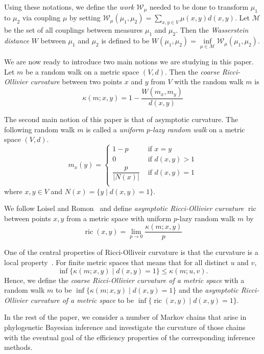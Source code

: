 \documentclass{amsart}
\newcommand{\ric}{\operatorname{ric}}
\newcommand{\W}{\mathcal{W}}
\newcommand{\M}{\mathcal{M}}
\begin{document}
Using these notations, we define the {\em work} $\W_\mu$ needed to be done to transform $\mu_1$ to $\mu_2$ via coupling $\mu$ by setting $\W_\mu(\mu_1,\mu_2) = \sum\limits_{x,y\in V}\mu(x,y) d(x,y)$.
Let $\M$ be the set of all couplings between measures $\mu_1$ and $\mu_2$.
Then the {\em Wasserstein distance} $W$ between $\mu_1$ and $\mu_2$ is defined to be $W(\mu_1,\mu_2) = \inf\limits_{\mu\in\M}\W_\mu(\mu_1,\mu_2)$.

We are now ready to introduce two main notions we are studying in this paper.
Let $m$ be a random walk on a metric space $(V,d)$.
Then the {\em coarse Ricci-Ollivier curvature} between two points $x$ and $y$ from $V$ with the random walk $m$ is
\[
\kappa(m;x,y) = 1 - \frac{W(m_x,m_y)}{d(x,y)}
\]

The second main notion of this paper is that of asymptotic curvature.
The following random walk $m$ is called a {\em uniform $p$-lazy random walk} on a metric space $(V,d)$.
\[
m_x(y) =
\begin{cases}
1-p				& \mbox{ if } x=y \\
0   				& \mbox{ if } d(x,y) > 1 \\
\dfrac{p}{|N(x)|}  & \mbox{ if } d(x,y) = 1 \\
\end{cases}
\]
where $x,y \in V$ and $N(x) = \{y \mid d(x,y) = 1\}$.

We follow Loisel and Romon~\cite{Loisel2014-gu} and define {\em asymptotic Ricci-Ollivier curvature} $\ric$ between points $x,y$ from a metric space with uniform $p$-lazy random walk $m$ by 
\[
\ric(x,y) = \lim_{p\to0} \frac{\kappa(m;x,y)}{p}
\]

One of the central properties of Ricci-Olliveir curvature is that the curvature is a local property~\cite{Ollivier2009-cj}.
For finite metric spaces that means that for all distinct $u$ and $v$,
\[
\inf\{\kappa(m;x,y)\mid d(x,y) = 1\} \leq \kappa(m;u,v).
\]
Hence, we define the {\em coarse Ricci-Ollivier curvature of a metric space} with a random walk $m$ to be $\inf\{\kappa(m;x,y)\mid d(x,y) = 1\}$ and the {\em asymptotic Ricci-Ollivier curvature of a metric space} to be $\inf\{\ric(x,y)\mid d(x,y) = 1\}$.

In the rest of the paper, we consider a number of Markov chains that arise in phylogenetic Bayesian inference and investigate the curvature of those chains with the eventual goal of the efficiency properties of the corresponding inference methods.
\end{document}
